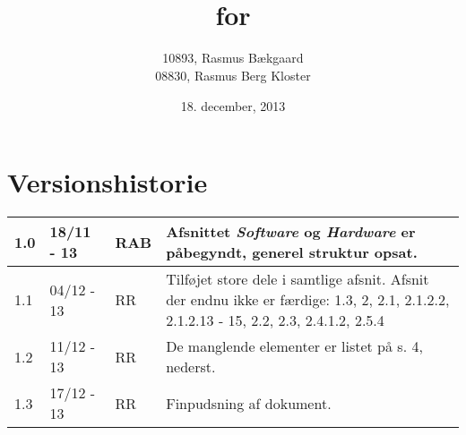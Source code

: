 \documentclass[oneside, 12pt]{memoir}
\title{\DocumentType \\ for \\ \ProjectName}
\date{18. december, 2013}
\author{10893, Rasmus Bækgaard\\08830, Rasmus Berg Kloster}
\begin{document}
\begin{titlingpage}
	
\end{titlingpage}


\section*{Versionshistorie}
\begin{tabular}{p{}|p{}|p{}|p{}}
\hline
1.0 & 18/11 - 13 & RAB & Afsnittet \textit{Software} og \textit{Hardware} er påbegyndt, generel struktur opsat.\\ \hline
1.1 & 04/12 - 13 & RR & Tilføjet store dele i samtlige afsnit. Afsnit der endnu ikke er færdige: 1.3, 2, 2.1, 2.1.2.2, 2.1.2.13 - 15, 2.2, 2.3, 2.4.1.2, 2.5.4 
\\ \hline 
1.2 & 11/12 - 13 & RR & De manglende elementer er listet på s. 4, nederst.
\\  \hline
1.3 & 17/12 - 13 & RR & Finpudsning af dokument. \\  \hline
\end{tabular} 




\newpage
\tableofcontents* %
\newpage
\listoffigures* %

\listoffixmes







\newpage
\appendix


{\RaggedRight
}
\end{document}
